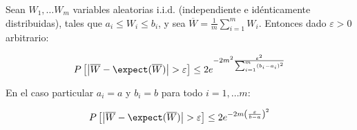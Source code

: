 \begin{lemma}
 Sean $W_1, \ldots W_m$ variables aleatorias i.i.d. (independiente e idénticamente distribuidas), tales que 
 $a_i \le W_i \le b_i$, y sea $\overline{W} = \frac{1}{m} \sum_{i=1}^m W_i$. Entonces dado $\varepsilon > 0$ arbitrario:

 \[P\left[\left| \overline{W} - \expect(\overline{W}) \right| > \varepsilon \right] \le 2e^{-2m^2 \frac{\varepsilon^2}{\sum_{i=1}^m (b_i-a_i)^2}}\]
 
 En el caso particular $a_i = a$ y $b_i = b$ para todo $i=1, \ldots m$:
 
 \[P\left[\left| \overline{W} - \expect(\overline{W}) \right| > \varepsilon \right] \le 2e^{-2m \left(\frac{\varepsilon}{b-a}\right)^2}\]
 
 
 \label{ineq:hoeffding}
\end{lemma}

